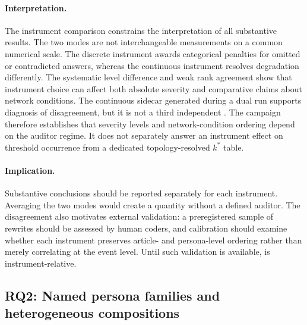 \paragraph{Interpretation.}
The instrument comparison constrains the interpretation of all substantive
results. The two modes are not interchangeable measurements on a common numerical
scale. The discrete instrument awards categorical penalties for omitted or
contradicted answers, whereas the continuous instrument resolves degradation
differently. The systematic level difference and weak rank agreement show
that instrument choice can affect both absolute severity and comparative
claims about network conditions. The continuous sidecar generated during a
dual run supports diagnosis of disagreement, but it is not a third
independent \MPR{}. The campaign therefore establishes that severity levels
and network-condition ordering depend on the auditor regime. It does not
separately answer an instrument effect on threshold occurrence from a
dedicated topology-resolved \(k^{*}\) table.

\paragraph{Implication.}
Substantive conclusions should be reported separately for each instrument.
Averaging the two modes would create a quantity without a defined auditor.
The disagreement also motivates external validation: a preregistered sample
of rewrites should be assessed by human coders, and calibration should examine
whether each instrument preserves article- and persona-level ordering rather
than merely correlating at the event level. Until such validation is
available, \kstar{} is instrument-relative.

\subsection{RQ2: Named persona families and heterogeneous compositions}

